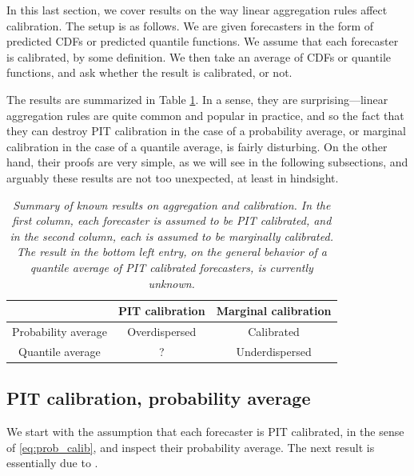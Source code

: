 \documentclass{article}
\begin{document}
In this last section, we cover results on the way linear aggregation rules
affect calibration. The setup is as follows. We are given forecasters in the
form of predicted CDFs or predicted quantile functions. We assume that each
forecaster is calibrated, by some definition. We then take an average of CDFs or
quantile functions, and ask whether the result is calibrated, or not.

The results are summarized in Table \ref{tab:aggr_calib}. In a sense, they are
surprising---linear aggregation rules are quite common and popular in practice,
and so the fact that they can destroy PIT calibration in the case of a probability 
average, or marginal calibration in the case of a quantile average, is fairly
disturbing. On the other hand, their proofs are very simple, as we will see in
the following subsections, and arguably these results are not too unexpected, at
least in hindsight. 

\begin{table}[htb]
\centering
\begin{tabular}{c|c|c}
& PIT calibration & Marginal calibration \\
\hline
Probability average & Overdispersed & Calibrated \\
\hline
Quantile average & ? & Underdispersed 
\end{tabular}
\caption{\it Summary of known results on aggregation and calibration. In the
  first column, each forecaster is assumed to be PIT calibrated, and in the
  second column, each is assumed to be marginally calibrated. The result in the
  bottom left entry, on the general behavior of a quantile average of PIT
  calibrated forecasters, is currently unknown.} 
\label{tab:aggr_calib}
\end{table}

\subsection{PIT calibration, probability average}

We start with the assumption that each forecaster is PIT calibrated, in the
sense of \eqref{eq:prob_calib}, and inspect their probability average. The next
result is essentially due to \citet{ranjan2010combining}.  
\end{document}
